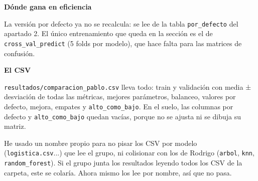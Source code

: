 \documentclass[11pt,a4paper]{article}
\begin{document}
{\smallskip\noindent\textbf{Dónde gana en eficiencia}\par
La versión por defecto ya no se recalcula: se lee de la tabla \texttt{por\_\allowbreak{}defecto} del apartado 2. El único entrenamiento que queda en la sección es el de \texttt{cross\_\allowbreak{}val\_\allowbreak{}predict} (5 folds por modelo), que hace falta para las matrices de confusión.

\smallskip\noindent\textbf{El CSV}\par
\texttt{resultados/\allowbreak{}comparacion\_\allowbreak{}pablo.csv} lleva todo: train y validación con media ± desviación de todas las métricas, mejores parámetros, balanceo, valores por defecto, mejora, empates y \texttt{alto\_\allowbreak{}como\_\allowbreak{}bajo}. En el suelo, las columnas por defecto y \texttt{alto\_\allowbreak{}como\_\allowbreak{}bajo} quedan vacías, porque no se ajusta ni se dibuja su matriz.

He usado un nombre propio para no pisar los CSV por modelo (\texttt{logistica.csv}...) que lee el grupo, ni colisionar con los de Rodrigo (\texttt{arbol}, \texttt{knn}, \texttt{random\_\allowbreak{}forest}). Si el grupo junta los resultados leyendo todos los CSV de la carpeta, este se colaría. Ahora mismo los lee por nombre, así que no pasa.

}
\end{document}
